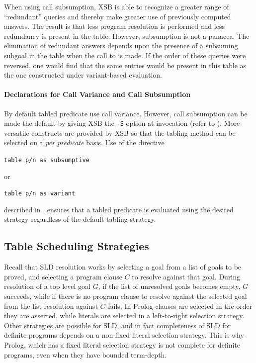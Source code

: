 %
When using call subsumption, XSB is able to recognize a greater range
of ``redundant'' queries and thereby make greater use of previously
computed answers.  The result is that less program resolution is
performed and less redundancy is present in the table.  However,
subsumption is not a panacea.  The elimination of redundant answers
depends upon the presence of a subsuming subgoal in the table when the
call to  is made.  If the order of these queries were
reversed, one would find that the same entries would be present in
this table as the one constructed under variant-based evaluation.

\paragraph{Declarations for Call Variance and Call Subsumption}
By default tabled predicate use call variance.  However, call
subsumption can be made the default by giving XSB the \verb|-S| option
at invocation (refer to ).  More versatile
constructs are provided by XSB so that the tabling method can be
selected on a \emph{per predicate} basis.  Use of the directive

{\tt table p/n as subsumptive}

or 

{\tt table p/n as variant}

described in , ensures that a tabled
predicate is evaluated using the desired strategy regardless of the
default tabling strategy.


\subsection{Table Scheduling Strategies} \label{section:scheduling}

Recall that SLD resolution works by selecting a goal from a list of
goals to be proved, and selecting a program clause $C$ to resolve
against that goal.  During resolution of a top level goal $G$, if the
list of unresolved goals becomes empty, $G$ succeeds, while if there
is no program clause to resolve against the selected goal from the
list resolution against $G$ fails.  In Prolog clauses are selected in
the order they are asserted, while literals are selected in a
left-to-right selection strategy.  Other strategies are possible for
SLD, and in fact completeness of SLD for definite programs depends on
a non-fixed literal selection strategy.  This is why Prolog, which has
a fixed literal selection strategy is not complete for definite
programs, even when they have bounded term-depth.

